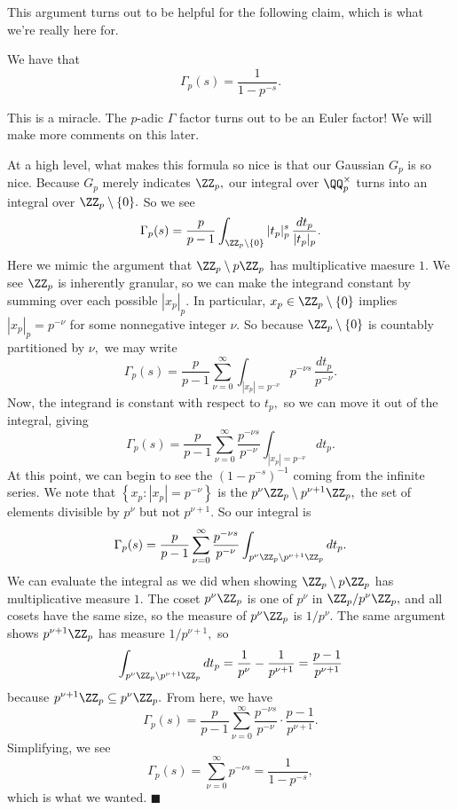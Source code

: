 This argument turns out to be helpful for the following claim, which is what we're really here for.
\begin{proposition}
    We have that
    \[\Gamma_p(s)=\frac1{1-p^{-s}}.\]
\end{proposition}
This is a miracle. The $p$-adic $\Gamma$ factor turns out to be an Euler factor! We will make more comments on this later.

At a high level, what makes this formula so nice is that our Gaussian $G_p$ is so nice. Because $G_p$ merely indicates $\ZZ_p,$ our integral over $\QQ_p^\times$ turns into an integral over $\ZZ_p\setminus\{0\}.$ So we see
\[\Gamma_p(s)=\frac p{p-1}\int_{\ZZ_p\setminus\{0\}}|t_p|^s_p\,\frac{dt_p}{|t_p|_p}.\]
Here we mimic the argument that $\ZZ_p\setminus p\ZZ_p$ has multiplicative maesure $1.$ We see $\ZZ_p$ is inherently granular, so we can make the integrand constant by summing over each possible $|x_p|_p.$ In particular, $x_p\in\ZZ_p\setminus\{0\}$ implies $|x_p|_p=p^{-\nu}$ for some nonnegative integer $\nu.$ So because $\ZZ_p\setminus\{0\}$ is countably partitioned by $\nu,$ we may write
\[\Gamma_p(s)=\frac p{p-1}\sum_{\nu=0}^\infty\int_{|x_p|=p^{-\nu}}p^{-\nu s}\,\frac{dt_p}{p^{-\nu}}.\]
Now, the integrand is constant with respect to $t_p,$ so we can move it out of the integral, giving
\[\Gamma_p(s)=\frac p{p-1}\sum_{\nu=0}^\infty\frac{p^{-\nu s}}{p^{-\nu}}\int_{|x_p|=p^{-\nu}}dt_p.\]
At this point, we can begin to see the $\left(1-p^{-s}\right)^{-1}$ coming from the infinite series. We note that $\left\{x_p:|x_p|=p^{-\nu}\right\}$ is the $p^\nu\ZZ_p\setminus p^{\nu+1}\ZZ_p,$ the set of elements divisible by $p^\nu$ but not $p^{\nu+1}.$ So our integral is
\[\Gamma_p(s)=\frac p{p-1}\sum_{\nu=0}^\infty\frac{p^{-\nu s}}{p^{-\nu}}\int_{p^{\nu}\ZZ_p\setminus p^{\nu+1}\ZZ_p}dt_p.\]
We can evaluate the integral as we did when showing $\ZZ_p\setminus p\ZZ_p$ has multiplicative measure $1.$ The coset $p^\nu\ZZ_p$ is one of $p^\nu$ in $\ZZ_p/p^\nu\ZZ_p,$ and all cosets have the same size, so the measure of $p^\nu\ZZ_p$ is $1/p^\nu.$ The same argument shows $p^{\nu+1}\ZZ_p$ has measure $1/p^{\nu+1},$ so
\[\int_{p^{\nu}\ZZ_p\setminus p^{\nu+1}\ZZ_p}dt_p=\frac1{p^\nu}-\frac1{p^{\nu+1}}=\frac{p-1}{p^{\nu+1}}\]
because $p^{\nu+1}\ZZ_p\subseteq p^\nu\ZZ_p.$ From here, we have
\[\Gamma_p(s)=\frac p{p-1}\sum_{\nu=0}^\infty\frac{p^{-\nu s}}{p^{-\nu}}\cdot\frac{p-1}{p^{\nu+1}}.\]
Simplifying, we see
\[\Gamma_p(s)=\sum_{\nu=0}^\infty p^{-\nu s}=\frac1{1-p^{-s}},\]
which is what we wanted. $\blacksquare$

